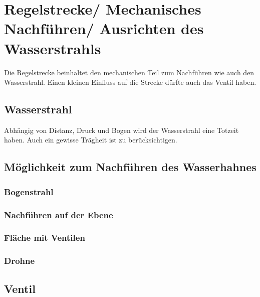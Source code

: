 \section{Regelstrecke/ Mechanisches Nachführen/ Ausrichten des Wasserstrahls}

Die Regelstrecke beinhaltet den mechanischen Teil zum Nachführen wie auch den Wasserstrahl. Einen kleinen Einfluss auf die Strecke dürfte auch das Ventil haben.


	\subsection{Wasserstrahl}
	Abhängig von Distanz, Druck und Bogen wird der Wasserstrahl eine Totzeit haben. Auch ein gewisse Trägheit ist zu berücksichtigen.
	
	
	\subsection{Möglichkeit zum Nachführen des Wasserhahnes}
		
		\subsubsection{Bogenstrahl}
		
		\subsubsection{Nachführen auf der Ebene}
		
		\subsubsection{Fläche mit Ventilen}
		
		\subsubsection{Drohne}
	
	
	\subsection{Ventil}
	
	